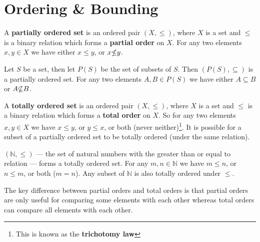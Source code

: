 \documentclass[../real_analysis.tex]{subfiles}
\begin{document}
    \section{Ordering \& Bounding}
        \begin{definition}
            A \textbf{partially ordered set} is an ordered pair $(X, \leq)$, where $X$ is a set and $\leq$ is a binary relation which forms a \textbf{partial order} on $X$. For any two elements $x, y \in X$ we have either $x \leq y$, or $x \slashed{\leq} y$.
        \end{definition}
        \begin{example}
            Let $S$ be a set, then let $P(S)$ be the set of subsets of $S$. Then $(P(S), \subseteq)$ is a partially ordered set. For any two elements $A, B \in P(S)$ we have either $A \subseteq B$ or $A \slashed{\subseteq} B$.
        \end{example}
        \begin{definition}
            A \textbf{totally ordered set} is an ordered pair $(X, \leq)$, where $X$ is a set and $\leq$ is a binary relation which forms a \textbf{total order} on $X$. So for any two elements $x, y \in X$ we have $x \leq y$, or $y \leq x$, or both (never neither)\footnote{This is known as the \textbf{trichotomy law}}. It is possible for a subset of a partially ordered set to be totally ordered (under the same relation).
        \end{definition}
        \begin{example}
            $(\mathbb{N}, \leq)$ --- the set of natural numbers with the greater than or equal to relation --- forms a totally ordered set. For any $m, n \in \mathbb{N}$ we have $m \leq n$, or $n \leq m$, or both ($m=n$). Any subset of $\mathbb{N}$ is also totally ordered under $\leq$.
        \end{example}
        The key difference between partial orders and total orders is that partial orders are only useful for comparing some elements with each other whereas total orders can compare all elements with each other.
\end{document}
